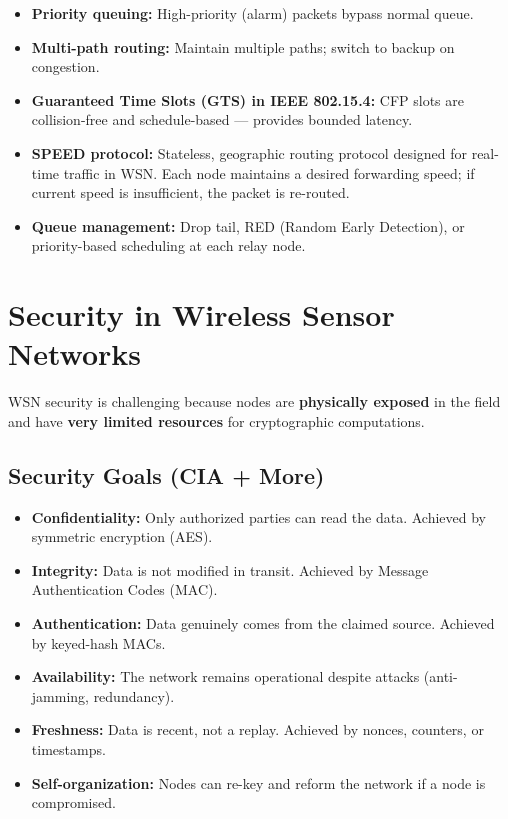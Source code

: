 \documentclass[12pt,a4paper]{article}
\begin{document}
\begin{itemize}[leftmargin=*, itemsep=3pt]
  \item \textbf{Priority queuing:} High-priority (alarm) packets bypass normal queue.
  \item \textbf{Multi-path routing:} Maintain multiple paths; switch to backup on congestion.
  \item \textbf{Guaranteed Time Slots (GTS) in IEEE 802.15.4:} CFP slots are collision-free and schedule-based --- provides bounded latency.
  \item \textbf{SPEED protocol:} Stateless, geographic routing protocol designed for real-time traffic in WSN. Each node maintains a desired forwarding speed; if current speed is insufficient, the packet is re-routed.
  \item \textbf{Queue management:} Drop tail, RED (Random Early Detection), or priority-based scheduling at each relay node.
\end{itemize}

\section{Security in Wireless Sensor Networks}

WSN security is challenging because nodes are \textbf{physically exposed} in the field and have \textbf{very limited resources} for cryptographic computations.

\subsection{Security Goals (CIA + More)}

\begin{tcolorbox}[examplebox, title={\textbf{Security Goals in WSN}}]
\begin{itemize}[leftmargin=*, itemsep=4pt]
  \item \textbf{Confidentiality:} Only authorized parties can read the data. Achieved by symmetric encryption (AES).
  \item \textbf{Integrity:} Data is not modified in transit. Achieved by Message Authentication Codes (MAC).
  \item \textbf{Authentication:} Data genuinely comes from the claimed source. Achieved by keyed-hash MACs.
  \item \textbf{Availability:} The network remains operational despite attacks (anti-jamming, redundancy).
  \item \textbf{Freshness:} Data is recent, not a replay. Achieved by nonces, counters, or timestamps.
  \item \textbf{Self-organization:} Nodes can re-key and reform the network if a node is compromised.
\end{itemize}
\end{tcolorbox}
\end{document}
